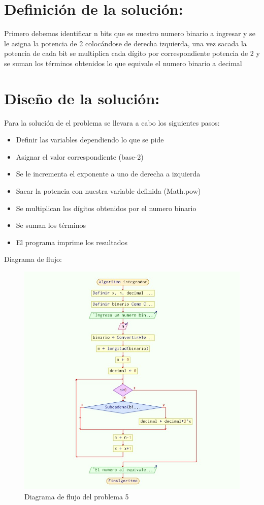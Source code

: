 \documentclass{IEEEcsmag}
\begin{document}
\section*{Definición de la solución:} 
Primero debemos identificar n bits que es nuestro numero binario a ingresar y se le asigna la potencia de 2 colocándose de derecha izquierda, una vez sacada la potencia de cada bit se multiplica cada dígito por correspondiente potencia de 2 y se suman los términos obtenidos lo que equivale el numero binario a decimal 


\section*{Diseño de la solución:}

Para la solución de el problema se llevara a cabo los siguientes pasos:

\begin{itemize}
	\item Definir las variables dependiendo lo que se pide  
	\item Asignar el valor correspondiente (base-2)
	\item Se le incrementa el exponente a uno de derecha a izquierda 
	\item Sacar la potencia con nuestra variable definida (Math.pow)
	\item Se multiplican los dígitos obtenidos por el numero binario
	\item Se suman los términos 
	\item El programa imprime los resultados 
\end{itemize}

    Diagrama de flujo:  
\begin{figure}[h!]
    \centering
    \includegraphics[width = 8 cm]{./latex-imagenes/DiagramaFlujo5.jpg}
    \caption{Diagrama de flujo del problema 5}
    \label{fig:Diagramadeflujode2 problema2}
\end{figure}
  
\end{document}
